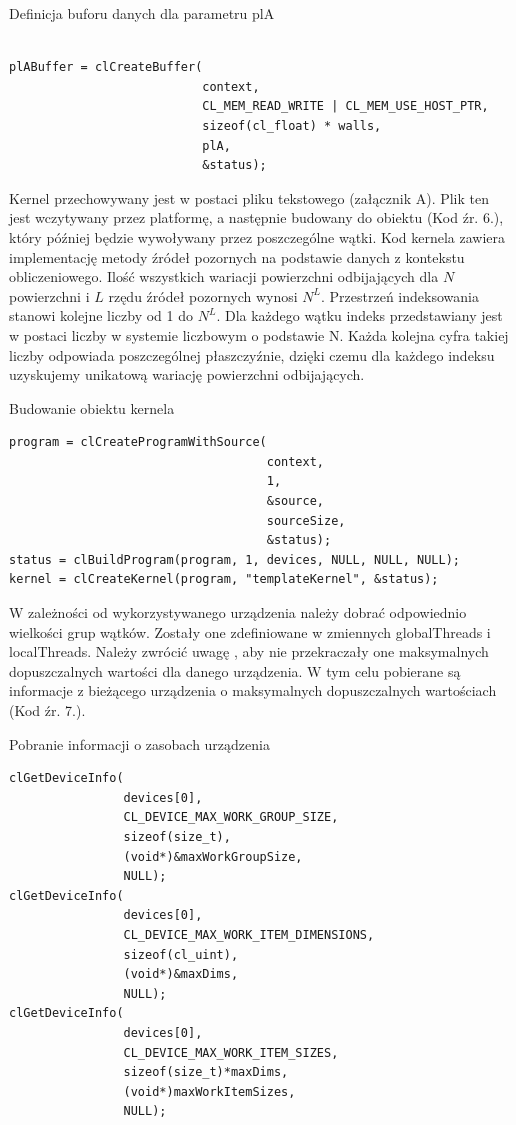 \begin{program}
\caption{Definicja buforu danych dla parametru plA}
\begin{lstlisting}

plABuffer = clCreateBuffer(
                           context, 
                           CL_MEM_READ_WRITE | CL_MEM_USE_HOST_PTR,
                           sizeof(cl_float) * walls,
                           plA, 
                           &status);
\end{lstlisting}
\end{program}
Kernel przechowywany jest w postaci pliku tekstowego (załącznik A). Plik ten jest wczytywany przez platformę, a następnie budowany do obiektu (Kod źr. 6.), który później będzie wywoływany przez poszczególne wątki. Kod kernela zawiera implementację metody źródeł pozornych na podstawie danych z kontekstu obliczeniowego. Ilość wszystkich wariacji powierzchni odbijających dla $N$ powierzchni i $L$ rzędu źródeł pozornych wynosi $N^L$. Przestrzeń indeksowania stanowi kolejne liczby od 1 do $N^L$. Dla każdego wątku indeks przedstawiany jest w postaci liczby w systemie liczbowym o podstawie N. Każda kolejna cyfra takiej liczby odpowiada poszczególnej płaszczyźnie, dzięki czemu dla każdego indeksu uzyskujemy unikatową wariację powierzchni odbijających.
\begin{program}
\caption{Budowanie obiektu kernela}
\begin{lstlisting}
program = clCreateProgramWithSource(
                                    context, 
                                    1, 
                                    &source,
                                    sourceSize,
                                    &status);
status = clBuildProgram(program, 1, devices, NULL, NULL, NULL);
kernel = clCreateKernel(program, "templateKernel", &status);
\end{lstlisting}
\end{program}
W zależności od wykorzystywanego urządzenia należy dobrać odpowiednio wielkości grup wątków. Zostały one zdefiniowane w zmiennych globalThreads i localThreads. Należy zwrócić uwagę , aby nie przekraczały one maksymalnych dopuszczalnych wartości dla danego urządzenia. W tym celu pobierane są informacje z bieżącego urządzenia o maksymalnych dopuszczalnych wartościach (Kod źr. 7.).
\begin{program}
\caption{Pobranie informacji o zasobach urządzenia}
\begin{lstlisting}
clGetDeviceInfo(
                devices[0], 
                CL_DEVICE_MAX_WORK_GROUP_SIZE, 
                sizeof(size_t), 
                (void*)&maxWorkGroupSize, 
                NULL);
clGetDeviceInfo(
                devices[0], 
                CL_DEVICE_MAX_WORK_ITEM_DIMENSIONS, 
                sizeof(cl_uint), 
                (void*)&maxDims, 
                NULL);
clGetDeviceInfo(
                devices[0], 
                CL_DEVICE_MAX_WORK_ITEM_SIZES, 
                sizeof(size_t)*maxDims,
                (void*)maxWorkItemSizes,
                NULL);
\end{lstlisting}
\end{program}
